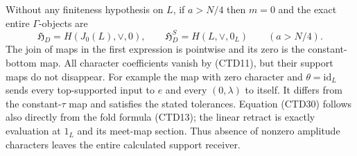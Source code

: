 Without any finiteness hypothesis on $L$, if $a>N/4$ then
$m=0$ and the exact entire $\Gamma$-objects are
\begin{equation}\tag{CTD30}
\mathfrak H_D=H(J_0(L),\vee,0),\qquad
\mathfrak H_D^S=H(L,\vee,0_L)\qquad(a>N/4).
\end{equation}
The join of maps in the first expression is pointwise and
its zero is the constant-bottom map. All character
coefficients vanish by (CTD11), but their support maps do
not disappear. For example the map with zero character
and $\theta=\mathrm{id}_L$ sends every top-supported input
to $e$ and every $(0,\lambda)$ to itself. It differs from
the constant-$\tau$ map and satisfies the stated tolerances.
Equation (CTD30) follows also directly from the fold formula
(CTD13); the linear retract is exactly evaluation at $1_L$
and its meet-map section. Thus absence of nonzero amplitude
characters leaves the entire calculated support receiver.


